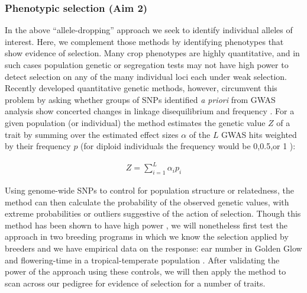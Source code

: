 \documentclass[12pt]{article}
\begin{document}

\subsubsection*{Phenotypic selection (Aim 2)}

In the above ``allele-dropping'' approach we seek to identify individual alleles of interest.
Here, we complement those methods by identifying phenotypes that show evidence of selection.
Many crop phenotypes are highly quantitative, and in such cases population genetic or segregation tests may not have high power to detect selection on any of the many individual loci each under weak selection.
Recently developed quantitative genetic methods, however, circumvent this problem by asking whether groups of SNPs identified \emph{a priori} from GWAS analysis show concerted changes in linkage disequilibrium and frequency \citep{Berg:2014bs}.
For a given population (or individual) the method estimates the genetic value $Z$ of a trait by summing over the estimated effect sizes $\alpha$ of the $L$ GWAS hits weighted by their frequency $p$ (for diploid individuals the frequency would be 0,0.5,or 1 ): 

\begin{align}
    Z = \sum_{i=1}^L\alpha_ip_i
	\label{eq:berg}
\end{align}

Using genome-wide SNPs to control for population structure or relatedness, the method can then calculate the probability of the observed genetic values, with extreme probabilities or outliers suggestive of the action of selection.
Though this method has been shown to have high power \citep{Berg:2014bs}, we will nonetheless first test the approach in two breeding programs in which we know the selection applied by breeders and we have empirical data on the response: ear number in Golden Glow \citep{beissinger2014genome} and flowering-time in a tropical-temperate population \citep{Teixeira:2014hr}.
After validating the power of the approach using these controls, we will then apply the method to scan across our pedigree for evidence of selection for a number of traits.
\end{document}
